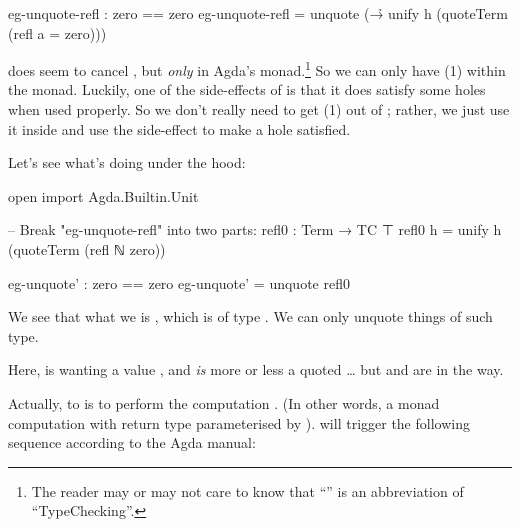 \documentclass{article}
\newcommand{\superEmph}{\emph}
\begin{document}
\begin{code}
eg-unquote-refl : zero == zero
eg-unquote-refl = unquote (\h → unify h (quoteTerm (refl {a = zero})))
\end{code}

 does seem to cancel , but \superEmph{only} in Agda's  monad.\footnote{The reader may or may not care to know that ``'' is an abbreviation of ``TypeChecking''.} So we can only have (1) within the  monad. Luckily, one of the side-effects of  is that it does satisfy some holes when used properly. So we don't really need to get (1) out of ; rather, we just use it inside and use the side-effect to make a hole satisfied.

Let's see what's  doing under the hood:

\begin{code}
open import Agda.Builtin.Unit

-- Break "eg-unquote-refl" into two parts:
refl0 : Term → TC ⊤
refl0 h = unify h (quoteTerm (refl {ℕ} {zero}))

eg-unquote' : zero == zero
eg-unquote' = unquote refl0
\end{code}

We see that what we  is , which is of type    . We can only unquote things of such type.

Here,  is wanting a value , and  \emph{is} more or less a quoted \ldots{} but  and  are in the way.

Actually, to  is to perform the computation  \AgdaSymbol{:}    . (In other words, a  monad computation with return type  parameterised by ).  will trigger the following sequence according to the Agda manual:
\end{document}
